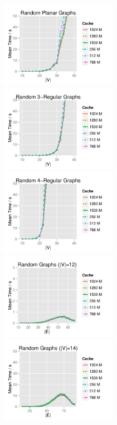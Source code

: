 \begin{figure}[!p]
\centering
\includegraphics[width=0.5\textwidth]{data/Exp3_planar_graphs.pdf}%
\includegraphics[width=0.5\textwidth]{data/Exp3_reg3_graphs.pdf}
\includegraphics[width=0.5\textwidth]{data/Exp3_reg4_graphs.pdf}%
\includegraphics[width=0.5\textwidth]{data/Exp3_random12_graphs.pdf}
\includegraphics[width=0.5\textwidth]{data/Exp3_random14_graphs.pdf}%

\end{figure}
